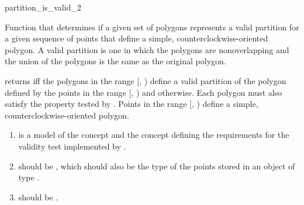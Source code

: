 \renewcommand\ccRefPageBegin{\ccParDims\cgalColumnLayout\begin{ccAdvanced}}
\renewcommand\ccRefPageEnd{\ccParDims\cgalColumnLayout\end{ccAdvanced}}
\begin{ccRefFunction}{partition_is_valid_2}

\ccDefinition

Function that determines if a given set of polygons represents
a valid partition for a given sequence of points that 
define a simple, counterclockwise-oriented polygon.  A valid partition is one in
which the polygons are nonoverlapping and the union of the polygons is the 
same as the original polygon.


{
returns  iff the polygons in the range [, 
) define a valid partition of the polygon defined by the 
points in the range [, ) and 
 otherwise.  
Each polygon must also satisfy the property 
tested by . 
\ccPrecond Points in the range [, ) define
a simple, counterclockwise-oriented polygon.
}

\begin{enumerate}
    \item {} is a model of the concept 
           and the
          concept defining the requirements for the validity test 
          implemented by .
    \item {} should be ,
          which should also be the type of the points stored in an object
          of type .
    \item {} should be 
          .
\end{enumerate}


\end{ccRefFunction}

